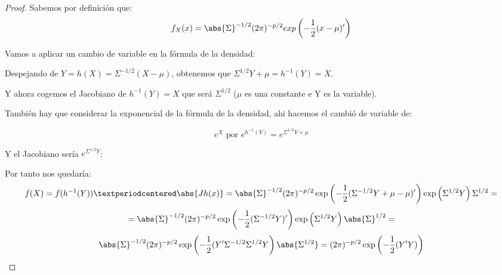 \begin{proof}
Sabemos por definición que:
\[
f_X(x)=\abs{\Sigma}^{-1/2}(2\pi)^{-p/2} exp \left( -\frac{1}{2}(x-\mu)' \right)
\]

Vamos a aplicar un cambio de variable en la fórmula de la densidad:

Despejando de $Y = h(X)= \Sigma^{-1/2}(X-\mu)$, obtenemos que $\Sigma^{1/2}Y+\mu=h^{-1}(Y)=X$.

Y ahora cogemos el Jacobiano de $h^{-1}(Y)=X$ que será $\Sigma^{1/2}$ ($\mu$ es una constante e Y es la variable).

También hay que considerar la exponencial de la fórmula de la densidad, ahi hacemos el cambió de variable de:

$$e^X \text{ por } e^{h^{-1}(Y)}=e^{\Sigma^{1/2}Y+\mu}$$

Y el Jacobiano sería $e^{\Sigma^{1/2}Y}$:


Por tanto nos quedaría:
\[
f(X) = f(h^{-1}(Y))·\abs{Jh(x)} = \abs{\Sigma}^{-1/2}(2 \pi)^{-p/2} \exp\left(-\frac{1}{2}(\Sigma^{-1/2}Y+\mu-\mu)'  \right) \exp\left( \Sigma^{1/2}Y \right) \Sigma^{1/2}  =
\]
\[
= \abs{\Sigma}^{-1/2}(2 \pi)^{-p/2} \exp\left(-\frac{1}{2}(\Sigma^{-1/2}Y)' \right) \exp\left( \Sigma^{1/2}Y \right) \abs{\Sigma}^{1/2} =
\]
\[
\abs{\Sigma}^{-1/2}(2 \pi)^{-p/2} \exp\left(-\frac{1}{2}(Y'\Sigma^{-1/2}\Sigma^{1/2}Y \right) \abs{\Sigma^{1/2}} = (2 \pi)^{-p/2} \exp\left(-\frac{1}{2}(Y'Y) \right)
\]
\end{proof}



